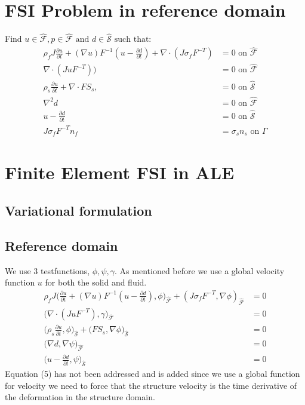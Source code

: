 \section*{FSI Problem in reference domain}
Find $u \in \hat{\mathcal{F}} , p \in \hat{\mathcal{F}} \text{  and  } d \in \hat{\mathcal{S}} \text{  such that}:$ 
\begin{align}
\rho_f J \frac{\partial u}{\partial t} + (\nabla u)F^{-1}(u-\frac{\partial d}{\partial t})  + \nabla \cdot( J\sigma_f F^{-T})  &= 0 \text{  on  } \hat{\mathcal{F}} \\
\nabla \cdot (J u F^{-T})\big) &= 0 \text{  on  } \hat{\mathcal{F}}   \\
\rho_s \frac{\partial u}{\partial t} + \nabla \cdot F S_s,&=0  \text{  on  } \hat{\mathcal{S}}\\
\nabla^2 d &= 0  \text{  on  } \hat{\mathcal{F}}\\
u- \frac{\partial d}{\partial t}  &= 0  \text{  on  } \hat{\mathcal{S}}\\
J\sigma_f F^{-T} n_f &= \sigma_s  n_s \text{  on  } \Gamma
\end{align}



\section*{Finite Element FSI in ALE}
\subsection*{Variational formulation}
\subsection*{Reference domain}
We use 3 testfunctions, $\phi, \psi, \gamma$. As mentioned before we use a global velocity function $u$ for both the solid and fluid.
\begin{align}
\rho_f J \big( \frac{\partial u}{\partial t} + (\nabla u)F^{-1}(u-\frac{\partial d}{\partial t}) , \phi\big)_{\mathcal{\hat{F}}} + (J\sigma_f F^{-T},\nabla \phi )_{\mathcal{\hat{F}}} &= 0  \\
 \big( \nabla \cdot (J u F^{-T}),\gamma \big)_{\mathcal{\hat{F}}} &= 0 \\
\big(\rho_s \frac{\partial u}{\partial t},\phi \big)_{\mathcal{\hat{S}}} + \big(F S_s, \nabla \phi \big)_{\mathcal{\hat{S}}} &=0 \\
 \big( \nabla d , \nabla \psi \big)_{\mathcal{\hat{F}}} &= 0 \\
 \big( u- \frac{\partial d}{\partial t} ,\psi \big)_{\mathcal{\hat{S}}} &= 0 
\end{align}
Equation (5) has not been addressed and is added since we use a global function for velocity we need to force that the structure velocity is the time derivative of the deformation in the structure domain. 

